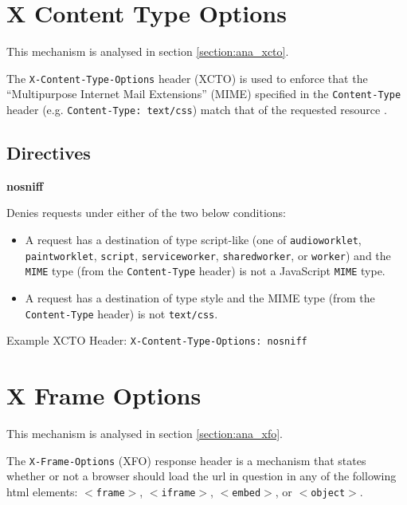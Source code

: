 \documentclass{mscreport}
\begin{document}
\section{X Content Type Options}
\label{section:bg_xcto}

This mechanism is analysed in section \ref{section:ana_xcto}.

\vspace{0.3cm} \noindent
The \texttt{X-Content-Type-Options} header (XCTO) is used to enforce that the ``Multipurpose Internet Mail Extensions'' (MIME) specified in the \texttt{Content-Type} header (e.g. \newline 
\texttt{Content-Type: text/css}) match that of the requested resource \cite{Apple_undated-hz}.

\subsection{Directives}

\textbf{nosniff}

\vspace{0.3cm} \noindent
Denies requests under either of the two below conditions:

\begin{itemize}
  \setlength\itemsep{0.1em}
  \item A request has a destination of type script-like (one of \texttt{audioworklet}, \texttt{paintworklet}, \texttt{script}, \texttt{serviceworker}, \texttt{sharedworker}, or \texttt{worker}) and the \texttt{MIME} type (from the \texttt{Content-Type} header) is not a JavaScript \texttt{MIME} type.
  \item A request has a destination of type style and the MIME type (from the \texttt{Content-Type} header) is not \texttt{text/css}.
\end{itemize}

\vspace{0.3cm} \noindent
Example XCTO Header: \texttt{X-Content-Type-Options: nosniff}

\section{X Frame Options}
\label{section:bg_xfo}

This mechanism is analysed in section \ref{section:ana_xfo}.

\vspace{0.3cm} \noindent
The \texttt{X-Frame-Options} (XFO) response header is a mechanism that states whether or not a browser should load the url in question in any of the following html elements: \texttt{$<$frame$>$}, \texttt{$<$iframe$>$}, \texttt{$<$embed$>$}, or \texttt{$<$object$>$}.
\end{document}
